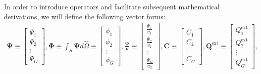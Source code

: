 %
In order to introduce operators and facilitate subsequent mathematical derivations, we will define
the following vector forms:
%
\begin{gather}
  \bm{\Psi} \equiv
  \begin{bmatrix}
    \Psi_1 \\
    \Psi_2 \\
    \vdots \\
    \Psi_G
  \end{bmatrix},
  \bm{\Phi} \equiv \int_S \bm{\Psi}d\hat{\Omega} \equiv
  \begin{bmatrix}
    \phi_1 \\
    \phi_2 \\
    \vdots \\
    \phi_G
  \end{bmatrix},
  \bm{\frac{\Psi}{v}} \equiv
  \begin{bmatrix}
    \frac{\Psi_1}{v_1} \\
    \frac{\Psi_2}{v_2} \\
    \vdots \\
    \frac{\Psi_G}{v_G}
  \end{bmatrix},
  \bm{C} \equiv
  \begin{bmatrix}
    C_1 \\
    C_2 \\
    \vdots \\
    C_G
  \end{bmatrix},
  \bm{Q}^{\text{ext}} \equiv
  \begin{bmatrix}
    Q^\text{ext}_1 \\
    Q^\text{ext}_2 \\
    \vdots \\
    Q^\text{ext}_G
  \end{bmatrix}, \nonumber
\end{gather}
